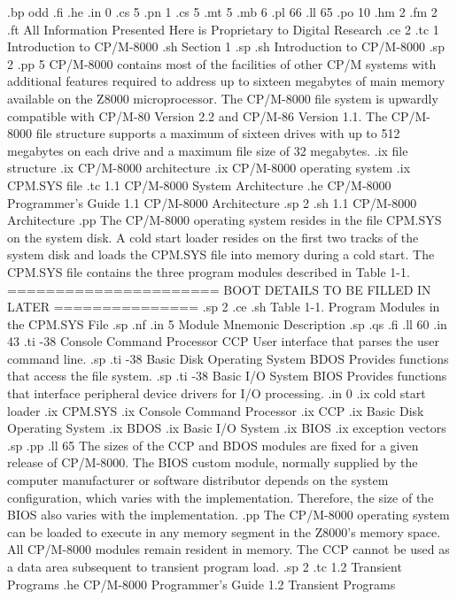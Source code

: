 
.bp odd
.fi
.he
.in 0
.cs 5
.pn 1
.cs 5
.mt 5
.mb 6
.pl 66
.ll 65
.po 10
.hm 2
.fm 2
.ft All Information Presented Here is Proprietary to Digital Research
.ce 2
.tc 1 Introduction to CP/M-8000
.sh
Section 1
.sp 
.sh
  Introduction to CP/M-8000   
.sp 2
.pp 5
CP/M-8000 contains most of the facilities of other CP/M systems with
additional features required to address up to sixteen megabytes of main
memory available on the Z8000 microprocessor.  The CP/M-8000 file system is
upwardly compatible with CP/M-80  Version 2.2 and CP/M-86  Version 1.1.  
The CP/M-8000 file structure supports a maximum of sixteen drives with up to
512 megabytes on each drive and a maximum file size of 32 megabytes. 
.ix file structure 
.ix CP/M-8000 architecture
.ix CP/M-8000 operating system
.ix CPM.SYS file
.tc    1.1  CP/M-8000 System Architecture
.he CP/M-8000 Programmer's Guide            1.1  CP/M-8000 Architecture
.sp 2
.sh
1.1  CP/M-8000 Architecture
.pp 
The CP/M-8000 operating system resides in the file CPM.SYS on
the system disk.  A cold start loader resides on the first
two tracks of the system disk and loads the CPM.SYS file into memory 
during a cold start.  The CPM.SYS file contains the three program modules 
described in Table 1-1. 
====================== BOOT DETAILS TO BE FILLED IN LATER ===============
.sp 2 
.ce
.sh
Table 1-1.  Program Modules in the CPM.SYS File 
.sp 
.nf
.in 5
         Module             Mnemonic      Description
.sp 
.qs
.fi
.ll 60
.in 43
.ti -38
Console Command Processor     CCP     User interface that parses the 
user command line. 
.sp
.ti -38
Basic Disk Operating System   BDOS    Provides functions that access the 
file system. 
.sp
.ti -38
Basic I/O System              BIOS    Provides functions that interface
peripheral device drivers for I/O processing.
.in 0
.ix cold start loader
.ix CPM.SYS
.ix Console Command Processor
.ix CCP
.ix Basic Disk Operating System
.ix BDOS
.ix Basic I/O System
.ix BIOS
.ix exception vectors 
.sp 
.pp
.ll 65
The sizes of the CCP and BDOS modules are fixed for a given
release of CP/M-8000.  The BIOS custom module, normally supplied by 
the computer manufacturer or software distributor
depends
on the system configuration, which varies with the
implementation.  Therefore, the size of the BIOS also varies with 
the implementation.
.pp 
The CP/M-8000 operating system can be loaded to execute in any
memory segment in the Z8000's memory space.
All CP/M-8000 modules remain resident in memory.  The CCP cannot be
used as a data area subsequent to transient program load. 
.sp 2
.tc    1.2 Transient Programs
.he CP/M-8000 Programmer's Guide               1.2  Transient Programs
